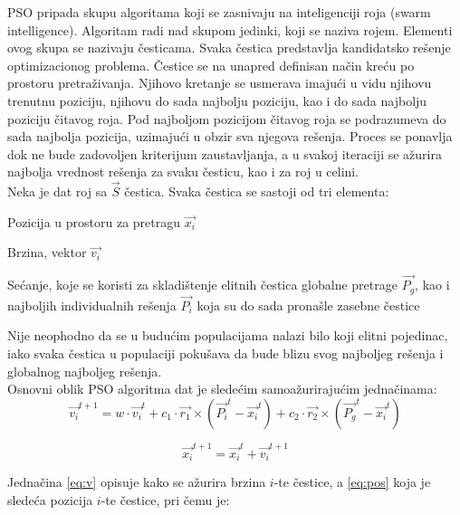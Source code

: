 \documentclass{article}
\begin{document}
PSO pripada skupu algoritama koji se zasnivaju na inteligenciji roja (swarm intelligence). Algoritam radi nad skupom jedinki, koji se naziva rojem. Elementi ovog skupa se nazivaju česticama. 
Svaka čestica predstavlja kandidatsko rešenje optimizacionog problema. Čestice se na unapred definisan način kreću po prostoru pretraživanja. Njihovo kretanje se usmerava imajući u vidu njihovu trenutnu poziciju, njihovu do sada najbolju poziciju, kao i do sada najbolju poziciju čitavog roja. Pod najboljom pozicijom čitavog roja se podrazumeva do sada najbolja pozicija, uzimajući u obzir sva njegova rešenja. Proces se ponavlja dok ne bude zadovoljen kriterijum zaustavljanja, a u svakoj iteraciji se ažurira najbolja vrednost rešenja za svaku česticu, kao i za roj u celini. \\

Neka je dat roj sa $\vec{S}$ čestica. Svaka čestica se sastoji od tri elementa:
\begin{list}{•}{}
	\item Pozicija u prostoru za pretragu $\vec{x_i}$
	\item Brzina, vektor $\vec{v_i}$
	\item Sećanje, koje se koristi za skladištenje elitnih čestica globalne pretrage $\vec{P_g}$, kao i najboljih individualnih rešenja $\vec{P_i}$ koja su do sada pronašle zasebne čestice\\
\end{list}

Nije neophodno da se u budućim populacijama nalazi bilo koji elitni pojedinac, iako svaka čestica u populaciji pokušava da bude blizu svog najboljeg rešenja i globalnog najboljeg rešenja. \\ 


Osnovni oblik PSO algoritma dat je sledećim samoažurirajućim jednačinama: \\ 
\begin{equation}\label{eq:v}
\vec{v_{i}}^{t+1} = w \cdot \vec{v_{i}}^{t} + c_1 \cdot \vec{r_1} \times (\vec{P_{i}}^{t} - \vec{x_{i}}^{t}) + c_2\cdot \vec{r_2} \times (\vec{P_{g}}^{t} - \vec{x_{i}}^{t}) 
\end{equation}

\begin{equation}\label{eq:pos}
\vec{x_{i}}^{t+1} = \vec{x_{i}}^{t} + \vec{v_{i}}^{t+1} 
\end{equation}

Jednačina \ref{eq:v} opisuje kako se ažurira brzina $i$-te čestice, a \ref{eq:pos} koja je sledeća pozicija $i$-te čestice, pri čemu je: 
\end{document}
